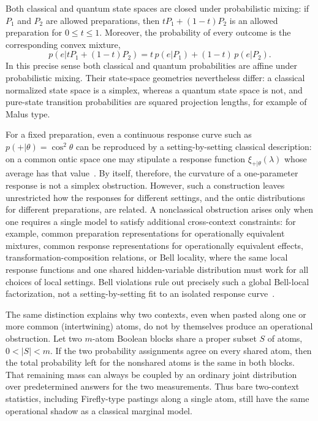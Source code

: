 \documentclass[aps,pra,twocolumn,superscriptaddress,nofootinbib]{revtex4-2}
\begin{document}
Both classical and quantum state spaces are closed under probabilistic mixing:
if \(P_1\) and \(P_2\) are allowed preparations, then
\(tP_1+(1-t)P_2\) is an allowed preparation for \(0\leq t\leq1\).  Moreover,
the probability of every outcome is the corresponding convex mixture,
\[
        p(e|tP_1+(1-t)P_2)
        =
        t\,p(e|P_1)+(1-t)\,p(e|P_2).
\]
In this precise sense both classical and quantum probabilities are affine
under probabilistic mixing.  Their state-space geometries nevertheless
differ: a classical normalized state space is a simplex, whereas a quantum
state space is not, and pure-state transition probabilities are squared
projection lengths, for example of Malus type.

For a fixed preparation, even a continuous response curve such as
\(p(+|\theta)=\cos^2\theta\) can be reproduced by a setting-by-setting
classical description: on a common ontic space one may stipulate a
response function \(\xi_{+|\theta}(\lambda)\) whose average has that value~\cite{aerts-69}.
By itself, therefore, the curvature of a one-parameter response is not a
simplex obstruction.  However, such a construction leaves unrestricted how the
responses for different settings, and the ontic distributions for different
preparations, are related.  A nonclassical obstruction arises only when one
requires a single model to satisfy additional cross-context constraints:
for example, common preparation representations for operationally equivalent
mixtures, common response representations for operationally equivalent
effects, transformation-composition relations, or Bell locality, where the
same local response functions and one shared hidden-variable distribution must
work for all choices of local settings.  Bell violations rule out precisely
such a global Bell-local factorization, not a setting-by-setting fit to an
isolated response curve~\cite{svozil-2026-os}.

The same distinction explains why two contexts, even when pasted along one or
more common (intertwining) atoms, do not by themselves produce an operational obstruction.
Let two \(m\)-atom Boolean blocks share a proper subset \(S\) of atoms,
\(0<|S|<m\).  If the two probability assignments agree on every shared atom,
then the total probability left for the nonshared atoms is the same in both
blocks.  That remaining mass can always be coupled by an ordinary joint
distribution over predetermined answers for the two measurements.  Thus bare
two-context statistics, including Firefly-type pastings along a single atom,
still have the same operational shadow as a classical marginal model.
\end{document}
